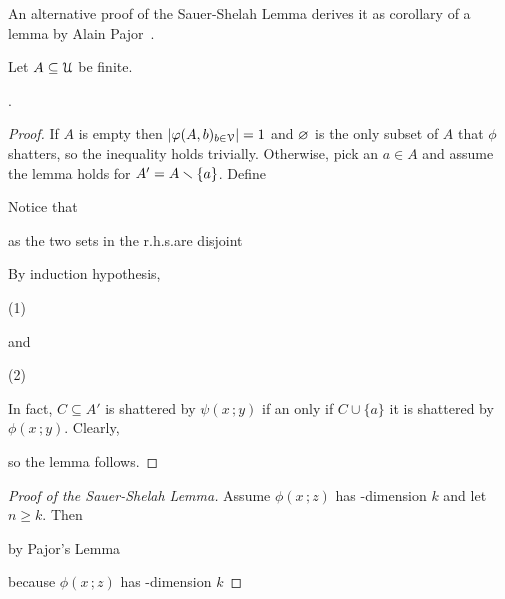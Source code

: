 \documentclass[scombinatorics.tex]{subfiles}
\begin{document}
An alternative proof of the Sauer-Shelah Lemma derives it as corollary of a lemma by Alain Pajor~\cite{pajor}.

\begin{void_thm}\label{lem_pajor}
  Let $A\subseteq\EuScript U$ be finite.
  
  .
\end{void_thm}

\begin{proof}
  If $A$ is empty then $|\varphi(A,b)_{b\in\EuScript V}|=1$ and $\varnothing$ is the only subset of $A$ that $\phi$ shatters, so the inequality holds trivially.
  Otherwise, pick an $a\in A$ and assume the lemma holds for $A'=A\smallsetminus\{a\}$.
  Define 


  Notice that
  
  
  as the two sets in the r.h.s.\@ are disjoint


  By induction hypothesis, 

  \hfill(1)
  
  and


  \hfill(2)

  In fact, $C\subseteq A'$ is shattered by $\psi(x\,;y)$ if an only if $C\cup\{a\}$ it is shattered by $\phi(x\,;y)$.
  Clearly, 


  so the lemma follows.
\end{proof}
  
\begin{proof}[Proof of the Sauer-Shelah Lemma]
  Assume $\phi(x\,;z)$ has \vc-dimension $k$ and let $n\ge k$.
  Then

  \smallskip

  \hfill by  Pajor's Lemma\smallskip
  
  \hfill because $\phi(x\,;z)$ has \vc-dimension $k$
\end{proof}
\end{document}

